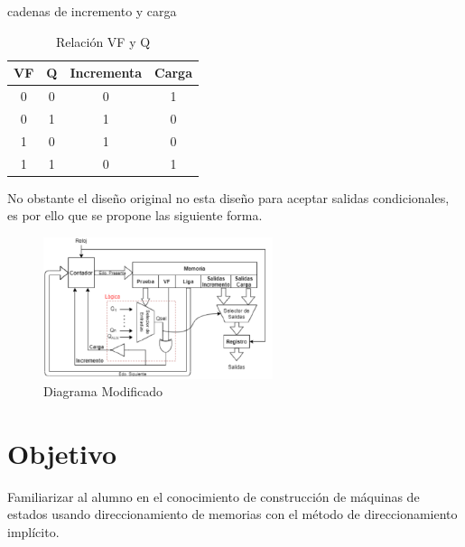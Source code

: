 \documentclass[table]{scrartcl}
\begin{document}
cadenas de incremento y carga
\begin{table}
  \centering
  \caption{Relación VF y Q}\label{tab:1}
  \begin{tabular}{|cc|c|c|}
    \hline
    VF & Q & Incrementa & Carga \\ \hline
    0 & 0 & 0 & 1 \\
    0 & 1 & 1 & 0 \\
    1 & 0 & 1 & 0 \\
    1 & 1 & 0 & 1 \\ \hline
  \end{tabular}
\end{table}
No obstante el diseño original no esta diseño para aceptar salidas
condicionales, es por ello que se propone las siguiente forma.
\begin{figure}[htbp]
  \centering
  \includegraphics[width=0.6\textwidth]{./img/3.png}
  \caption{Diagrama Modificado}\label{fig:3}
\end{figure}

\section{Objetivo}\label{sec:org8bfa7f0}
Familiarizar al alumno en el conocimiento de construcción de máquinas de estados
usando direccionamiento de memorias con el método de direccionamiento implícito.
\newpage{}
\end{document}
